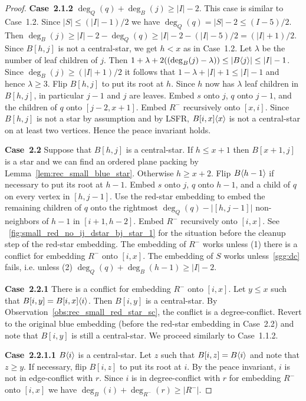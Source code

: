 \documentclass[11pt,a4paper,colorlinks=true,urlcolor=blue,citecolor=red]{article}
\theoremstyle{plain}
\newcommand{\case}[1]{\par\vspace{.5\baselineskip}\noindent\textbf{\sffamily Case~#1}}
\begin{document}
\begin{proof}
  \case{2.1.2} $\deg_Q(q)+\deg_B(j)\geq|I|-2$. This case is similar to
  Case~1.2. Since $|S|\leq(|I|-1)/2$ we have
  $\deg_Q(q)=|S|-2\leq(I-5)/2$. Then
  $\deg_B(j)\geq|I|-2-\deg_Q(q)\geq|I|-2-(|I|-5)/2=(|I|+1)/2$. Since
  $B[h,j]$ is not a central-star, we get $h<x$ as in Case~1.2. Let
  $\lambda$ be the number of leaf children of $j$. Then
  $1+\lambda+2((\deg_B(j)-\lambda))\leq|B\langle{j}\rangle|\leq|I|-1$. Since
  $\deg_B(j)\geq(|I|+1)/2$ it follows that $1-\lambda+|I|+1\leq|I|-1$
  and hence $\lambda\geq3$. Flip $B[h,j]$ to put its root at $h$.  Since
  $h$ now has $\lambda$ leaf children in $B[h,j]$, in particular $j-1$
  and $j$ are leaves. Embed $s$ onto $j$, $q$ onto $j-1$, and the
  children of $q$ onto $[j-2,x+1]$. Embed $R^-$ recursively onto
  $[x,i]$. Since $B[h,j]$ is not a star by assumption and by LSFR,
  $B{[i,x]}\langle{x}\rangle$ is not a central-star on at least two vertices.
  Hence the peace invariant holds.

  \case{2.2} Suppose that $B[h,j]$ is a central-star. If $h\leq x+1$
  then $B[x+1,j]$ is a star and we can find an ordered plane packing by
  Lemma~\ref{lem:rec_small_blue_star}. Otherwise $h\geq x+2$. Flip
  $B\langle{h-1}\rangle$ if necessary to put its root at $h-1$. Embed $s$ onto
  $j$, $q$ onto $h-1$, and a child of $q$ on every vertex in $[h,j-1]$.
  Use the red-star embedding to embed the remaining children of
  $q$ onto the rightmost $\deg_Q(q)-|[h,j-1]|$ non-neighbors of $h-1$ in
  $[i+1,h-2]$. Embed $R^-$ recursively onto $[i,x]$. See
  \figurename~\ref{fig:small_red_no_ij_dstar_bj_star_1} for the
  situation before the cleanup step of the red-star
  embedding. The embedding of $R^-$ works unless (1) there is a conflict
  for embedding $R^-$ onto $[i,x]$. The embedding of $S$ works
  unless~\ref{sgg:dc} fails, i.e. unless (2)
  $\deg_Q(q)+\deg_B(h-1)\geq|I|-2$.

  \case{2.2.1} There is a conflict for embedding $R^-$ onto $[i,x]$. Let
  $y\leq x$ such that $B[i,y]=B{[i,x]}\langle{i}\rangle$. Then $B[i,y]$ is a
  central-star. By Observation~\ref{obs:rec_small_red_star_sc}, the
  conflict is a degree-conflict. Revert to the original blue embedding
  (before the red-star embedding in Case~2.2) and note that
  $B[i,y]$ is still a central-star. We proceed similarly to Case~1.1.2.

  \case{2.2.1.1} $B\langle{i}\rangle$ is a central-star. Let $z$ such that
  $B[i,z]=B\langle{i}\rangle$ and note that $z\geq y$. If necessary, flip
  $B[i,z]$ to put its root at $i$. By the peace invariant, $i$ is not in
  edge-conflict with $r$. Since $i$ is in degree-conflict with $r$ for
  embedding $R^-$ onto $[i,x]$ we have $\deg_B(i)+\deg_{R^-}(r)\geq
  |R^-|$.


\end{proof}
\end{document}
